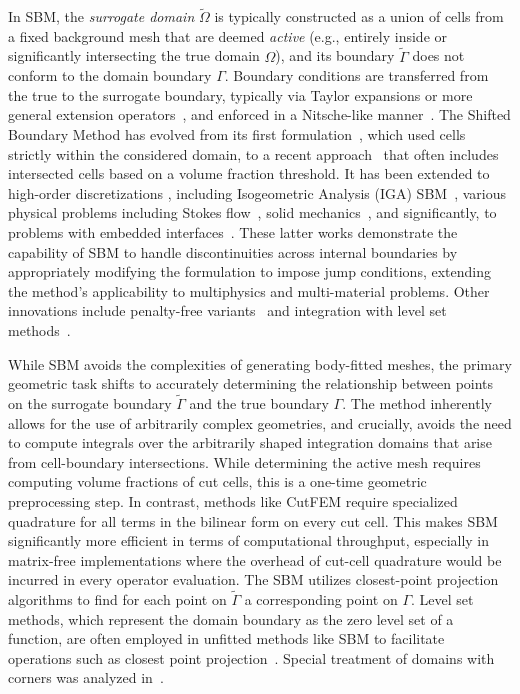 \documentclass{elsarticle}
\begin{document}
In SBM, the \emph{surrogate domain} $\tilde{\Omega}$ is typically constructed as a union of cells from a fixed
background mesh that are deemed \emph{active} (e.g., entirely inside or significantly intersecting the true domain
$\Omega$), and its boundary $\tilde{\Gamma}$ does not conform to the domain boundary $\Gamma$. Boundary conditions are
transferred from the true to the surrogate boundary, typically via Taylor expansions or more general extension
operators~\cite{zorrilla2024shifted}, and enforced in a Nitsche-like manner~\cite{nitsche1971variationsprinzip}. The
Shifted Boundary Method has evolved from its first formulation~\cite{main2018shifted, main2018shiftedVol2}, which used
cells strictly within the considered domain, to a recent approach~\cite{yang2024optimal} that often includes
intersected cells based on a volume fraction threshold. It has been extended to high-order discretizations
\cite{atallah2022high}, including Isogeometric Analysis (IGA) SBM~\cite{ANTONELLI2024shiftedIGA}, various physical
problems including Stokes flow~\cite{atallah2020analysis}, solid mechanics~\cite{atallah2021shifted,
    atallah2024nonlinear}, and significantly, to problems with embedded interfaces~\cite{li2020shifted, xu2024weighted}.
These latter works demonstrate the capability of SBM to handle discontinuities across internal boundaries by
appropriately modifying the formulation to impose jump conditions, extending the method's applicability to multiphysics
and multi-material problems. Other innovations include penalty-free variants~\cite{collins2023penalty} and integration
with level set methods~\cite{kuzmin2022unfitted, xue2021new}.

While SBM avoids the complexities of generating body-fitted meshes, the primary geometric task shifts to accurately
determining the relationship between points on the surrogate boundary $\tilde{\Gamma}$ and the true boundary $\Gamma$.
The method inherently allows for the use of arbitrarily complex geometries, and crucially, avoids the need to compute
integrals over the arbitrarily shaped integration domains that arise from cell-boundary intersections. While
determining the active mesh requires computing volume fractions of cut cells, this is a one-time geometric
preprocessing step. In contrast, methods like CutFEM require specialized quadrature for all terms in the bilinear form
on every cut cell. This makes SBM significantly more efficient in terms of computational throughput, especially in
matrix-free implementations where the overhead of cut-cell quadrature would be incurred in every operator evaluation.
The SBM utilizes closest-point projection algorithms to find for each point on $\tilde{\Gamma}$ a corresponding point
on $\Gamma$. Level set methods, which represent the domain boundary as the zero level set of a function, are often
employed in unfitted methods like SBM to facilitate operations such as closest point
projection~\cite{kuzmin2022unfitted, xue2021new}. Special treatment of domains with corners was analyzed
in~\cite{atallah2021analysis}.
\end{document}
